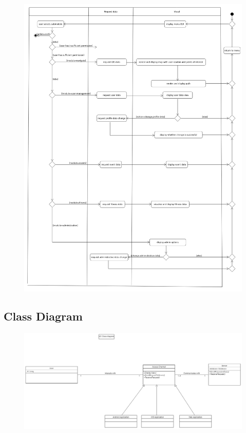 \begin{figure}[ht]
	\includegraphics[width=\textwidth]{Access_Modules/AccessActivity.png}
\end{figure}

\subsection{Class Diagram}

\begin{figure}[ht]
	\includegraphics[width=\textwidth]{Access_Modules/AC_ClassDiagram.png}
\end{figure}